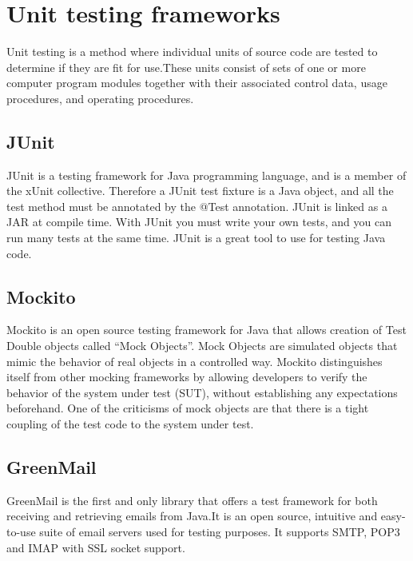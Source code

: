 \section{Unit testing frameworks}

Unit testing is a method where individual units of source code are tested to determine if they are fit for use.These units consist of sets of one or more computer program modules together with their associated control data, usage procedures, and operating procedures.

\subsection{JUnit}
JUnit is a testing framework for Java programming language, and is a member of the xUnit collective. Therefore a JUnit test fixture is a Java object, and all the test method must be annotated by the @Test annotation. JUnit is linked as a JAR at compile time. With JUnit you must write your own tests, and you can run many tests at the same time. JUnit is a great tool to use for testing Java code.

\subsection{Mockito}
Mockito is an open source testing framework for Java that allows creation of Test Double objects called “Mock Objects”. Mock Objects are simulated objects that mimic the behavior of real objects in a controlled way.
\newline
\newline
Mockito distinguishes itself from other mocking frameworks by allowing developers to verify the behavior of the system under test (SUT), without establishing any expectations beforehand.
One of the criticisms of mock objects are that there is a tight coupling of the test code to the system under test.

\subsection{GreenMail}
GreenMail is the first and only library that offers a test framework for both receiving and retrieving emails from Java.It is an open source, intuitive and easy-to-use suite of email servers used for testing purposes. It supports SMTP, POP3 and IMAP with SSL socket support.

